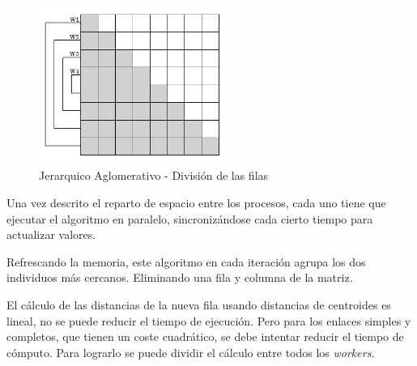 		\begin{figure}[!h]
			\centering
			\includegraphics[width=0.55\textwidth]{images/chapter_3/aglomerativo_mpi}
			
			
			\caption{Jerarquico Aglomerativo - División de las filas}
			\label{fig:aglomerativo}
		\end{figure}
		
		
		
		Una vez descrito el reparto de espacio entre los procesos, cada uno tiene que ejecutar el algoritmo en paralelo, sincronizándose cada cierto tiempo para actualizar valores.
		
		Refrescando la memoria, este algoritmo en cada iteración agrupa los dos individuos más cercanos. Eliminando una fila y columna de la matriz.
		
		\newpage
		
			
			
		
		El cálculo de las distancias de la nueva fila usando distancias de centroides es lineal, no se puede reducir el tiempo de ejecución. Pero para los enlaces simples y completos, que tienen un coste cuadrático, se debe intentar reducir el tiempo de cómputo. Para lograrlo se puede dividir el cálculo entre todos los \textit{workers}. 
		
